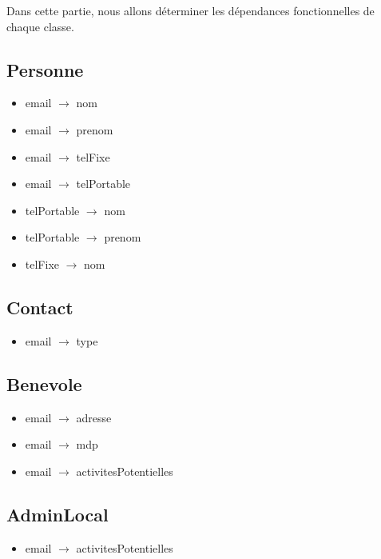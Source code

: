 \documentclass[asi, sansVersion]{picInsa}
\begin{document}
Dans cette partie, nous allons déterminer les dépendances fonctionnelles de chaque classe. \\ 

\subsection*{Personne}
\begin{itemize}
\item[] email $\rightarrow$ nom 
\item[] email $\rightarrow$ prenom 
\item[] email $\rightarrow$ telFixe 
\item[] email $\rightarrow$ telPortable 
\item[] telPortable $\rightarrow$ nom
\item[] telPortable $\rightarrow$ prenom
\item[] telFixe $\rightarrow$ nom
\end{itemize}


\subsection*{Contact}
\begin{itemize}
\item[] email $\rightarrow$ type 
\end{itemize}

\subsection*{Benevole}
\begin{itemize}
\item[] email $\rightarrow$ adresse 
\item[] email $\rightarrow$ mdp 
\item[] email $\rightarrow$ activitesPotentielles 
\end{itemize}


\subsection*{AdminLocal}
\begin{itemize}
\item[]email $\rightarrow$ activitesPotentielles 
\end{itemize}
\end{document}
